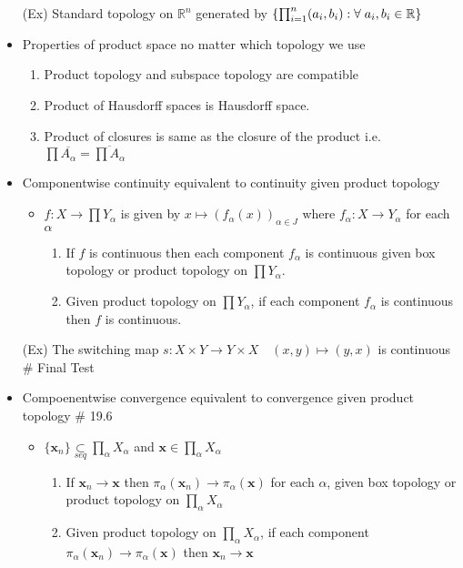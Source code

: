 \documentclass[12pt]{article}
\newcommand{\sptwo}{\hspace{0.2cm}}
\newcommand{\spone}{\hspace{0.1cm}}
\newcommand{\Real}{\mathbb{R}}
\newcommand{\seq}{\underset{seq}{\subset}}
\newcommand{\cl}{\overline}
\begin{document}
\begin{itemize}
	\item[(Ex)] Standard topology on $\Real^n$ generated by $\{\prod_{i=1}^n (a_i, b_i) : \forall \spone a_i, b_i \in \Real \}$
	\item Properties of product space no matter which topology we use
	\begin{enumerate}
		\item Product topology and subspace topology are compatible
		\item Product of Hausdorff spaces is Hausdorff space.
		\item Product of closures is same as the closure of the product \sptwo i.e. \sptwo $\prod \cl{A_\alpha}= \cl{\prod A_\alpha}$
	\end{enumerate}
\bigskip
	\item Componentwise continuity equivalent to continuity given product topology
	\begin{itemize}
		\item $f: X \rightarrow \prod Y_\alpha$ is given by $x\mapsto (f_\alpha(x))_{\alpha\in J}$ where $f_\alpha : X\rightarrow Y_\alpha$ for each $\alpha$
		\begin{enumerate}
			\item If $f$ is continuous then each component $f_\alpha$ is continuous given box topology or product topology on $\prod Y_\alpha$.
			\item Given product topology on $\prod Y_\alpha$, if each component $f_\alpha$ is continuous then $f$ is continuous.
		\end{enumerate}
	\end{itemize}
	\item[(Ex)] The switching map $s:X\times Y\rightarrow Y\times X \quad (x,y)\mapsto (y,x)$ is continuous \; \# Final Test
	\item Compoenentwise convergence equivalent to convergence given product topology \sptwo \# 19.6
	\begin{itemize}
		\item $\{\textbf{x}_n\}\seq \prod_\alpha X_\alpha$ and $\textbf{x}\in \prod_\alpha X_\alpha$
		\begin{enumerate}
			\item If $\textbf{x}_n \rightarrow \textbf{x}$ then $\pi_\alpha(\textbf{x}_n)\rightarrow \pi_\alpha(\textbf{x})$ for each $\alpha$, given box topology or product topology on $\prod_\alpha X_\alpha$
			\item Given product topology on $\prod_\alpha X_\alpha$, if each component $\pi_\alpha(\textbf{x}_n)\rightarrow \pi_\alpha(\textbf{x})$ then $\textbf{x}_n \rightarrow \textbf{x}$

\end{enumerate}
\end{itemize}
\end{itemize}
\end{document}
